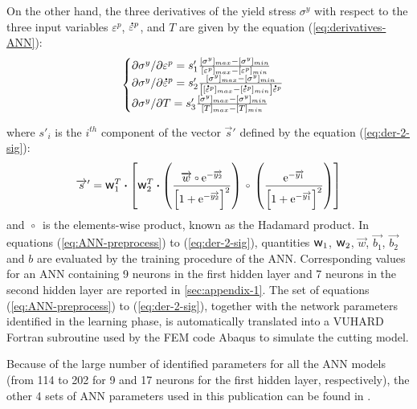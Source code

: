 \documentclass[preprint,12pt,times]{elsarticle}
\newcommand{\e}[1]{\mbox{\ensuremath{\mathrm{e}^{#1}}}}
\newcommand{\dotp}{\boldsymbol{\cdot}}
\newcommand{\w}{\mbox{\large\ensuremath{\mathsf{w}}}}
\newcommand{\mdot}[1]{\accentset{\mbox{\bfseries .}}{#1}} %
\newcommand{\ccirc}{\kern0.5ex\vcenter{\hbox{$\scriptstyle\circ$}}\kern0.5ex}
\begin{document}
On the other hand, the three derivatives of the yield stress $\sigma^y$ with respect to the three input variables $\varepsilon^p$, $\mdot{\varepsilon}^p$, and $T$ are given by the equation (\ref{eq:derivatives-ANN}):
\begin{equation}
\begin{cases}
\partial \sigma^y/\partial \varepsilon^p = s'_1 \frac{[\sigma^y]_{max} -[\sigma^y]_{min}}{[\varepsilon^p]_{max} -[\varepsilon^p]_{min}}\\
\partial \sigma^y/\partial\mdot{\varepsilon}^p = s'_2 \frac{[\sigma^y]_{max} -[\sigma^y]_{min}}{\left[[\mdot{\varepsilon}^p]_{max} -[\mdot{\varepsilon}^p]_{min}\right]\mdot{\varepsilon}^p}\\
\partial \sigma^y/\partial T = s'_3 \frac{[\sigma^y]_{max} -[\sigma^y]_{min}}{[T]_{max} -[T]_{min}}
\end{cases}\label{eq:derivatives-ANN}
\end{equation}

where $s'_i$ is the $i^{th}$ component of the vector $\overrightarrow{s}'$ defined by the equation (\ref{eq:der-2-sig}):
\begin{equation}
\overrightarrow{s}' =\w_1^T \dotp \left[\w_2^T \dotp \left( 
\frac{\overrightarrow{w} \ccirc \e{-\overrightarrow{y_2}}}
{\left[1 + \e{-\overrightarrow{y_2}}\right]^2}\right)\ccirc \left(\frac{
\e{-\overrightarrow{y_1}}}
{\left[1 + \e{-\overrightarrow{y_1}}\right]^2}
\right)\right]\label{eq:der-2-sig}
\end{equation}
and $\ccirc$ is the elements-wise product, known as the Hadamard product.
In equations (\ref{eq:ANN-preprocess}) to (\ref{eq:der-2-sig}), quantities $\w_1$, $\w_2$, $\overrightarrow{w}$, $\overrightarrow{b_1}$, $\overrightarrow{b_2}$ and $b$ are evaluated by the training procedure of the ANN. Corresponding values for an ANN containing 9 neurons in the first hidden layer and 7 neurons in the second hidden layer are reported in \ref{sec:appendix-1}.
The set of equations (\ref{eq:ANN-preprocess}) to (\ref{eq:der-2-sig}), together with the network parameters identified in the learning phase, is automatically translated into a VUHARD Fortran subroutine used by the FEM code Abaqus to simulate the cutting model.

Because of the large number of identified parameters for all the ANN models (from 114 to 202 for 9 and 17 neurons for the first hidden layer, respectively), the other 4 sets of ANN parameters used in this publication can be found in \cite{pantale_Coefficients_2022}.
\end{document}
